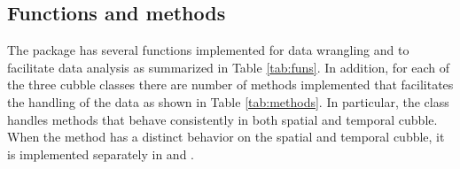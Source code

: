 \documentclass[
  shortnames]{jss}
\begin{document}
\hypertarget{functions-and-methods}{%
\subsection{Functions and methods}\label{functions-and-methods}}

The  package has several functions implemented for data wrangling and to facilitate data analysis as summarized in Table \ref{tab:funs}. In addition, for each of the three cubble classes there are number of methods implemented that facilitates the handling of the data as shown in Table \ref{tab:methods}. In particular, the  class handles methods that behave consistently in both spatial and temporal cubble. When the method has a distinct behavior on the spatial and temporal cubble, it is implemented separately in  and .
\end{document}

